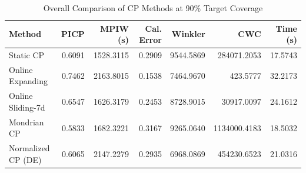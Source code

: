 \begin{table}
\caption{Overall Comparison of CP Methods at 90\% Target Coverage}
\label{tab:t5d_1_overall}
\begin{tabular}{lrrrrrr}
\toprule
Method & PICP & MPIW (s) & Cal. Error & Winkler & CWC & Time (s) \\
\midrule
Static CP & 0.6091 & 1528.3115 & 0.2909 & 9544.5869 & 284071.2053 & 17.5743 \\
Online Expanding & 0.7462 & 2163.8015 & 0.1538 & 7464.9670 & 423.5777 & 32.2173 \\
Online Sliding-7d & 0.6547 & 1626.3179 & 0.2453 & 8728.9015 & 30917.0097 & 24.1612 \\
Mondrian CP & 0.5833 & 1682.3221 & 0.3167 & 9265.0640 & 1134000.4183 & 18.5032 \\
Normalized CP (DE) & 0.6065 & 2147.2279 & 0.2935 & 6968.0869 & 454230.6523 & 21.0316 \\
\bottomrule
\end{tabular}
\end{table}
